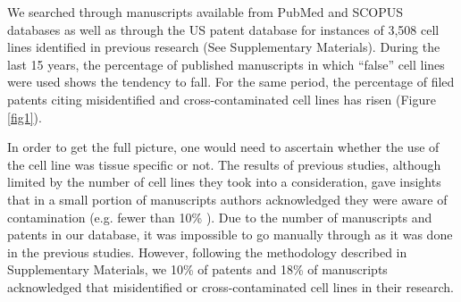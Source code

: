 \documentclass[12pt]{article}
\begin{document}
We searched through manuscripts available from PubMed and SCOPUS databases as well as through the US patent database for instances of 3,508 cell lines identified in previous research \cite{yu2015resource} (See Supplementary Materials). During the last 15 years, the percentage of published manuscripts in which ``false'' cell lines were used shows the tendency to fall. For the same period, the percentage of filed patents citing misidentified and cross-contaminated cell lines has risen (Figure \ref{fig1}).

     In order to get the full picture, one would need to ascertain whether the use of the cell line was tissue specific or not. The results of previous studies, although limited by the number of cell lines they took into a consideration, gave insights that in a small portion of manuscripts authors acknowledged they were aware of contamination (e.g. fewer than 10\% \cite{masters2005dna}). Due to the  number of manuscripts and patents in our database, it was impossible to go manually through  as it was done in the previous studies. However, following the methodology described in Supplementary Materials, we  10\% of patents and 18\% of manuscripts  acknowledged that  misidentified or cross-contaminated cell lines in their research.  
\end{document}
